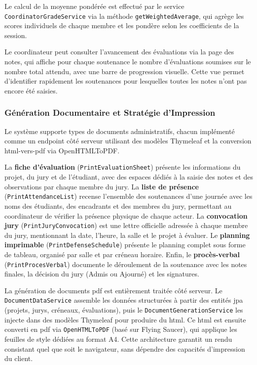 Le calcul de la moyenne pondérée est effectué par le service \texttt{CoordinatorGradeService} via la méthode \texttt{getWeightedAverage}, qui agrège les scores individuels de chaque membre et les pondère selon les coefficients de la session.

Le coordinateur peut consulter l'avancement des évaluations via la page des notes, qui affiche pour chaque soutenance le nombre d'évaluations soumises sur le nombre total attendu, avec une barre de progression visuelle. Cette vue permet d'identifier rapidement les soutenances pour lesquelles toutes les notes n'ont pas encore été saisies.

\subsubsection{Génération Documentaire et Stratégie d'Impression}
\label{ch4:module_print}

Le système supporte  types de documents administratifs, chacun implémenté comme un endpoint côté serveur utilisant des modèles Thymeleaf et la conversion \gls{html}-vers-\acrshort{pdf} via OpenHTMLToPDF.

La \textbf{fiche d'évaluation} (\texttt{PrintEvaluationSheet}) présente les informations du projet, du jury et de l'étudiant, avec des espaces dédiés à la saisie des notes et des observations par chaque membre du jury. La \textbf{liste de présence} (\texttt{PrintAttendanceList}) recense l'ensemble des soutenances d'une journée avec les noms des étudiants, des encadrants et des membres du jury, permettant au coordinateur de vérifier la présence physique de chaque acteur. La \textbf{convocation jury} (\texttt{PrintJuryConvocation}) est une lettre officielle adressée à chaque membre du jury, mentionnant la date, l'heure, la salle et le projet à évaluer. Le \textbf{planning imprimable} (\texttt{PrintDefenseSchedule}) présente le planning complet sous forme de tableau, organisé par salle et par créneau horaire. Enfin, le \textbf{procès-verbal} (\texttt{PrintProcesVerbal}) documente le déroulement de la soutenance avec les notes finales, la décision du jury (Admis ou Ajourné) et les signatures.

La génération de documents \acrshort{pdf} est entièrement traitée côté serveur. Le \texttt{DocumentDataService} assemble les données structurées à partir des entités \acrshort{jpa} (projets, jurys, créneaux, évaluations), puis le \texttt{DocumentGenerationService} les injecte dans des modèles Thymeleaf pour produire du \acrshort{html}. Ce \acrshort{html} est ensuite converti en \acrshort{pdf} via \texttt{OpenHTMLToPDF} (basé sur Flying Saucer), qui applique les feuilles de style dédiées au format A4. Cette architecture garantit un rendu consistant quel que soit le navigateur, sans dépendre des capacités d'impression du client.

